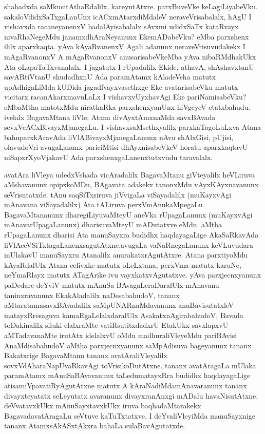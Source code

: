 shabadxda saMkucitAthaRdalilx, kareyutAtxre. parxBuveVke keLagiLiyabeVku. sakaloVdidxSaTxgaLanUnx icACx\-mAtarxdiMdaleV neraveVrisabalalx, hAgU I vishavxda racaneyanenxV badalAyisabalalx sAvxmi udidxSaTx kataRvayx nivaRhaNegeMdu janamxdhAraNeyanunx EkemADabeVku? eMba parxshenx ililx aparxkaqta. yAva kAyaRvanenxV Agali adanunx neraveVrisuvudakekx I mAgaRvanonxV A mAgaRvanonxV anusarisabeVkeMba yAva nibaRMdhakUkx Ata oLapaTaTxvanalalx. I jagatutx I rUpadalilx Ekide, athavA, shAshavxtanU savARtiVtanU shudadhxnU Ada paramAtamx kAla\break deVsha matutx upAdhigaLiMda kUDida jagadfvayxvasethxge Eke avatarisabeVku matutx \hbox{vicitarx} racanAkarxmavuLaLx I vishavxvUyxhavAgi Eke pariNamisabeVku? eMbaMtha matotxMdu nira\-thaRka parxshenxyanUnx hiVgeyeV etatxbahudu. ivelalx BagavaMtana liVle; Atana divAyxtAmx\-naMda savxBAvada sevxVcACxBivayxMjanegaLu. I vishavxsaMsethxyalilx parxkaTagoLuLxva Atana bahu\-parxkAravAda liVlABivayxMjanegaLanunx nAvu shAlxGisi, pUjisi, olavudoVri avu\-gaLanunx pariciMtisi dhAyxnisabeVkeV horatu aparxkaqtavU niSapxrXyoVjakavU Ada parxshenxgaLanenxtutxvudu taravalalx.

avatAra liVleya udedxVshada vicAradalilx BagavaMtanu giVteyalilx heVLiruva aMsha\-vanunx opipxkoMDu, BAgavata adakekx tanonxMdu vAyxKAyxnavanunx seVrisutatxde. tAnu saqSiTxsiruva jiVvigaLa viSayadalilx (muKayxvAgi mAnavana viSayadalilx) Ata tALiruva perxVmAnukaMpegaLu BagavaMtananunx dharegiLiyuvaMteyU aneVka rUpagaLanunx (muKayxvAgi mAnavarUpagaLanunx) dharisuvaMteyU mADutatxve eMdu. aMtha rUpagaLanunx dharisi Ata manuSayxra budidhx haqdayagaLige AkaSaRkavAda liVlAceVSiTxtagaLanenxsagutAtxne.\break avugaLa vaNaRnegaLanunx keVLuvudara mUlakavU manuSayxru Atanalilx anurakatxrAgu\-tAtxre. Atana parxtiyoMdu kAyaRdalUlx Atana celivxke matutx oLeLxtana, perxVma matutx karuNe, neYmaRlayx matutx ATagArike ivu vayxkatxvAgutatxve. yAva parxjecnxyanunx paDedare deYviV matutx mAnuSa BAvagaLeraDaralUlx mAnavanu taninxravanunx EkakAladalilx naDesa\-bahudoV, tananx aMtaratamasavxBAvadalilx saMpUNARnaMdavanunx anuBavisutatxleV matayxRresaguva kamaRgaLelalxdaralUlx AsakatxnAgirabahudoV, Bavada toDakinalilx siluki elalxraMte vatiRsutitxdadxrU EtakUkx savxlapxvU aMTadavanaMte irutAtx idelalxvU oMdu madhura\-liVleyeMdu pariBAvisi AnaMdisabahudoV aMtha parxjecnxyanunx saMpAdisuva bage\-yanunx tananx Bakatxrige BagavaMtanu tananx avatAraliVleyalilx sovxVdAharaNapUvaRkavAgi toVrisikoDutAtxne. tananx avatAragaLa mUlaka paramAtamx mAnuSaBAvavanunx taLedu\break matayxRra budidhx haqdayagaLige atisamiVpavatiRyAgutAtxne matutx A kAraNadiMda\break mAnavaranunx tananx divayxteyatatx seLeyutatx avaranunx divayxranAnxgi mADalu havaNisu\-tAtxne. deVvatavxkUkx mAnuSayxtavxkUkx iruva baqhadaMtarakekx BagavadavatAragaLu seVtuve kaTuTxtatxve. I deYvaliVleyiMda manuSayxnige tananx AtamxsAkASxtAkxra bahaLa sulaBavAgutatxde.

